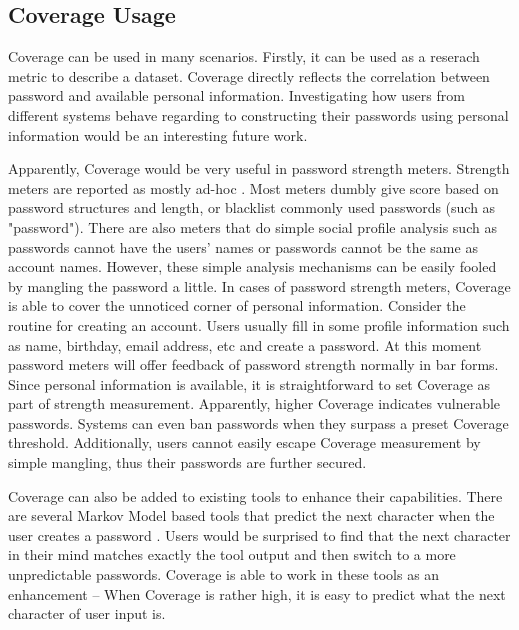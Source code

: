 \subsection{Coverage Usage}
Coverage can be used in many scenarios. Firstly, it can be used as a reserach metric to describe a dataset. Coverage directly reflects the correlation between password and available personal information. Investigating how users from different systems behave regarding to constructing their passwords using personal information would be an interesting future work. 

Apparently, Coverage would be very useful in password strength meters. Strength meters are reported as mostly ad-hoc \cite{de2014very}. Most meters dumbly give score based on password structures and length, or blacklist commonly used passwords (such as "password"). There are also meters that do simple social profile analysis such as passwords cannot have the users' names or passwords cannot be the same as account names. However, these simple analysis mechanisms can be easily fooled by mangling the password a little. In cases of password strength meters, Coverage is able to cover the unnoticed corner of personal information. Consider the routine for creating an account. Users usually fill in some profile information such as name, birthday, email address, etc and create a password. At this moment password meters will offer feedback of password strength normally in bar forms. Since personal information is available, it is straightforward to set Coverage as part of strength measurement. Apparently, higher Coverage indicates vulnerable passwords. Systems can even ban passwords when they surpass a preset Coverage threshold. Additionally, users cannot easily escape Coverage measurement by simple mangling, thus their passwords are further secured. 

Coverage can also be added to existing tools to enhance their capabilities. There are several Markov Model based tools that predict the next character when the user creates a password \cite{komanduri2014telepathwords}\cite{weir2010testing}. Users would be surprised to find that the next character in their mind matches exactly the tool output and then switch to a more unpredictable passwords. Coverage is able to work in these tools as an enhancement -- When Coverage is rather high, it is easy to predict what the next character of user input is.

